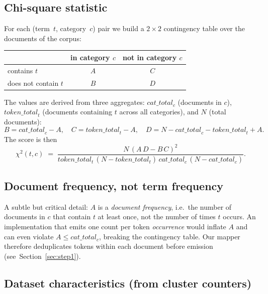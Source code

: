 \documentclass[11pt,a4paper]{article}
\begin{document}
\subsection*{Chi-square statistic}

For each (term~$t$, category~$c$) pair we build a $2\times2$ contingency
table over the documents of the corpus:

\begin{center}
\begin{tabular}{lcc}
\toprule
            & in category $c$ & not in category $c$ \\
\midrule
contains $t$     & $A$ & $C$ \\
does not contain $t$ & $B$ & $D$ \\
\bottomrule
\end{tabular}
\end{center}

\noindent The values are derived from three aggregates:
$\textit{cat\_total}_c$ (documents in $c$),
$\textit{token\_total}_t$ (documents containing $t$ across all categories),
and $N$ (total documents):
\[
B = \textit{cat\_total}_c - A,\quad
C = \textit{token\_total}_t - A,\quad
D = N - \textit{cat\_total}_c - \textit{token\_total}_t + A.
\]
The score is then
\begin{equation}
\chi^{2}(t,c) \;=\;
\frac{N\,(A\,D - B\,C)^{2}}
     {\textit{token\_total}_t\,(N-\textit{token\_total}_t)\,
      \textit{cat\_total}_c\,(N-\textit{cat\_total}_c)}.
\label{eq:chi2}
\end{equation}

\subsection*{Document frequency, not term frequency}

A subtle but critical detail: $A$ is a \emph{document frequency}, i.e.\ the
number of documents in $c$ that contain $t$ at least once, not the number of
times $t$ occurs.  An implementation that emits one count per token
\emph{occurrence} would inflate $A$ and can even violate $A \le
\textit{cat\_total}_c$, breaking the contingency table.  Our mapper therefore
deduplicates tokens within each document before emission
(see~Section~\ref{sec:step1}).

\subsection*{Dataset characteristics (from cluster counters)}
\end{document}
